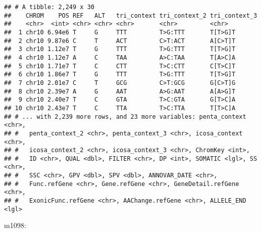 \documentclass[]{article}
\begin{document}
\begin{verbatim}
## # A tibble: 2,249 x 30
##    CHROM    POS REF   ALT   tri_context tri_context_2 tri_context_3
##    <chr>  <int> <chr> <chr> <chr>       <chr>         <chr>        
##  1 chr10 6.94e6 T     G     TTT         T>G:TTT       T[T>G]T      
##  2 chr10 9.87e6 C     T     ACT         C>T:ACT       A[C>T]T      
##  3 chr10 1.12e7 T     G     TTT         T>G:TTT       T[T>G]T      
##  4 chr10 1.12e7 A     C     TAA         A>C:TAA       T[A>C]A      
##  5 chr10 1.71e7 T     C     CTT         T>C:CTT       C[T>C]T      
##  6 chr10 1.86e7 T     G     TTT         T>G:TTT       T[T>G]T      
##  7 chr10 2.01e7 C     T     GCG         C>T:GCG       G[C>T]G      
##  8 chr10 2.39e7 A     G     AAT         A>G:AAT       A[A>G]T      
##  9 chr10 2.40e7 T     C     GTA         T>C:GTA       G[T>C]A      
## 10 chr10 2.43e7 T     C     TTA         T>C:TTA       T[T>C]A      
## # ... with 2,239 more rows, and 23 more variables: penta_context <chr>,
## #   penta_context_2 <chr>, penta_context_3 <chr>, icosa_context <chr>,
## #   icosa_context_2 <chr>, icosa_context_3 <chr>, ChromKey <int>,
## #   ID <chr>, QUAL <dbl>, FILTER <chr>, DP <int>, SOMATIC <lgl>, SS <chr>,
## #   SSC <chr>, GPV <dbl>, SPV <dbl>, ANNOVAR_DATE <chr>,
## #   Func.refGene <chr>, Gene.refGene <chr>, GeneDetail.refGene <chr>,
## #   ExonicFunc.refGene <chr>, AAChange.refGene <chr>, ALLELE_END <lgl>
\end{verbatim}

m1098:
\end{document}
